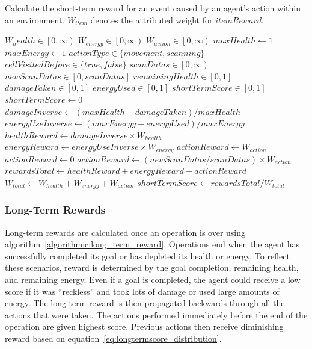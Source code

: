 \begin{algorithm}
  \caption{Calculate the short-term reward for an event caused by an agent's action within an environment. $W_{item}$ denotes the attributed weight for $itemReward$.}
  \begin{algorithmic} \label{algorithmic:short_term_reward}
    \REQUIRE $W_health \in \left[0, \infty \right)$
    \REQUIRE $W_{energy} \in \left[0, \infty \right)$
    \REQUIRE $W_{action} \in \left[0, \infty \right)$
    \REQUIRE $maxHealth \leftarrow 1$
    \REQUIRE $maxEnergy \leftarrow 1$
    \REQUIRE $actionType \in \{movement, scanning\}$
    \REQUIRE $cellVisitedBefore \in \{true, false\}$
    \REQUIRE $scanDatas \in \left[0, \infty \right)$
    \REQUIRE $newScanDatas \in \left[0, scanDatas \right]$
    \REQUIRE $remainingHealth \in \left[0, 1 \right]$
    \REQUIRE $damageTaken \in \left[0, 1 \right]$
    \REQUIRE $energyUsed \in \left[0, 1 \right]$
    \ENSURE $shortTermScore \in \left[0, 1 \right]$
      \RETURN $shortTermScore \leftarrow 0$
    \ELSE
      \STATE $damageInverse \leftarrow (maxHealth - damageTaken) / maxHealth$
      \STATE $energyUseInverse \leftarrow (maxEnergy - energyUsed) / maxEnergy$
      \STATE $healthReward \leftarrow damageInverse \times W_{health}$
      \STATE $energyReward \leftarrow energyUseInverse \times W_{energy}$
          \STATE $actionReward \leftarrow W_{action}$
        \ELSE
          \STATE $actionReward \leftarrow 0$
        \ENDIF
      \ELSE
        \STATE $actionReward \leftarrow (newScanDatas / scanDatas) \times W_{action}$
      \ENDIF
      \STATE $rewardsTotal \leftarrow healthReward + energyReward + actionReward$
      \STATE $W_{total} \leftarrow W_{health} + W_{energy} + W_{action}$
      \RETURN $shortTermScore \leftarrow rewardsTotal / W_{total}$
    \ENDIF
  \end{algorithmic}
\end{algorithm}


\subsubsection{Long-Term Rewards}
Long-term rewards are calculated once an operation is over using algorithm~\ref{algorithmic:long_term_reward}.
Operations end when the agent has successfully completed its goal or has depleted its health or energy.
To reflect these scenarios, reward is determined by the goal completion, remaining health, and remaining energy.
Even if a goal is completed, the agent could receive a low score if it was ``reckless'' and took lots of damage or used large amounts of energy.
The long-term reward is then propagated backwards through all the actions that were taken.
The actions performed immediately before the end of the operation are given highest score.
Previous actions then receive diminishing reward based on equation~\ref{eq:longtermscore_distribution}.

